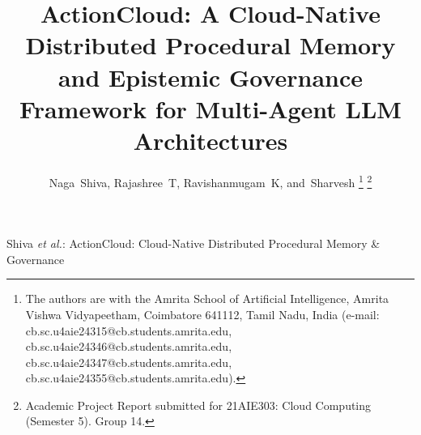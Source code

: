 \documentclass[lettersize,journal]{IEEEtran}
\begin{document}
\title{ActionCloud: A Cloud-Native Distributed Procedural Memory and Epistemic Governance Framework for Multi-Agent LLM Architectures}

\author{Naga~Shiva,
        Rajashree~T,
        Ravishanmugam~K,
        and~Sharvesh%
\thanks{The authors are with the Amrita School of Artificial Intelligence, Amrita Vishwa Vidyapeetham, Coimbatore 641112, Tamil Nadu, India (e-mail: cb.sc.u4aie24315@cb.students.amrita.edu, cb.sc.u4aie24346@cb.students.amrita.edu, cb.sc.u4aie24347@cb.students.amrita.edu, cb.sc.u4aie24355@cb.students.amrita.edu).}%
\thanks{Academic Project Report submitted for 21AIE303: Cloud Computing (Semester 5). Group 14.}%
}

%
{Shiva \MakeLowercase{\textit{et al.}}: ActionCloud: Cloud-Native Distributed Procedural Memory \& Governance}

\maketitle
\end{document}
